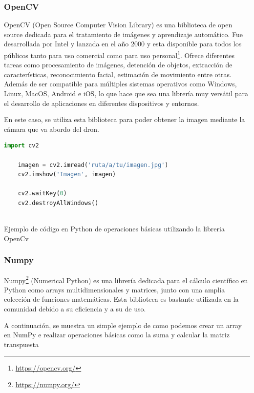 \subsubsection{OpenCV}
\label{sec:OpenCV}
OpenCV (Open Source Computer Vision Library) es una biblioteca de open source dedicada para el tratamiento de imágenes y aprendizaje automático. Fue desarrollada por Intel y lanzada en 
el año 2000 y esta disponible para todos los públicos tanto para uso comercial como para uso personal\footnote{\url{https://opencv.org/}}.
Ofrece diferentes tareas como procesamiento de imágenes, detención de objetos, extracción de características, reconocimiento facial, estimación de movimiento entre otras. Además de ser
compatible para múltiples sistemas operativos como Windows, Linux, MacOS, Android e iOS, lo que hace que sea una librería muy versátil para el desarrollo de aplicaciones en diferentes
dispositivos y entornos. 

En este caso, se utiliza esta biblioteca para poder obtener la imagen mediante la cámara que va abordo del dron.

\begin{code}[h]
  \begin{lstlisting}[language=Python]
    import cv2

    imagen = cv2.imread('ruta/a/tu/imagen.jpg')
    cv2.imshow('Imagen', imagen)
    
    cv2.waitKey(0)
    cv2.destroyAllWindows()
    
  \end{lstlisting}
  \caption[Ejemplo de código en Python de operaciones básicas utilizando la librería OpenCv]{Ejemplo de código en Python de operaciones básicas utilizando la libreria OpenCv}
  \label{cod:Numpy}
  \end{code}  

\subsubsection{Numpy}
\label{sec:Numpy}

Numpy\footnote{\url{https://numpy.org/}} (Numerical Python) es una librería dedicada para el cálculo científico en Python como arrays multidimensionales y matrices, junto con una amplia
colección de funciones matemáticas. Esta biblioteca es bastante utilizada en la comunidad debido a su eficiencia y a su de uso. 

A continuación, se muestra un simple ejemplo de como podemos crear un array en NumPy e realizar operaciones básicas como la suma y calcular la matriz transpuesta


